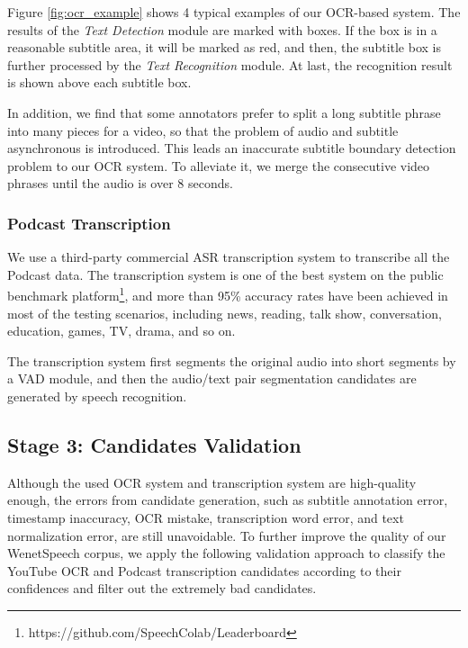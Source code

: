 \documentclass{article}
\begin{document}
Figure \ref{fig:ocr_example} shows 4 typical examples of our OCR-based system. The results of the \textit{Text Detection} module are marked with boxes. If the box is in a reasonable subtitle area, it will be marked as red, and then, the subtitle box is further processed by the \textit{Text Recognition} module. At last, the recognition result is shown above each subtitle box.


In addition, we find that some annotators prefer to split a long subtitle phrase into many pieces for a video, so that the problem of audio and subtitle asynchronous is introduced. This leads an inaccurate subtitle boundary detection problem to our OCR system. To alleviate it, we merge the consecutive video phrases until the audio is over 8 seconds.

\vspace{-1em}
\subsubsection{Podcast Transcription}
\vspace{-0.5em}
We use a third-party commercial ASR transcription system to transcribe all the Podcast data. The transcription system is one of the best system on the public benchmark platform\footnote{https://github.com/SpeechColab/Leaderboard}, and more than 95\% accuracy rates have been achieved in most of the testing scenarios, including news, reading, talk show, conversation, education, games, TV, drama, and so on.

The transcription system first segments the original audio into short segments by a VAD module, and then the audio/text pair segmentation candidates are generated by speech recognition.

\vspace{-1em}
\subsection{Stage 3: Candidates Validation}
\vspace{-0.5em}
Although the used OCR system and transcription system are high-quality enough, the errors from candidate generation, such as subtitle annotation error, timestamp inaccuracy, OCR mistake, transcription word error, and text normalization error, are still unavoidable. To further improve the quality of our WenetSpeech corpus, we apply the following validation approach to classify the YouTube OCR and Podcast transcription candidates according to their confidences and filter out the extremely bad candidates.
\end{document}
